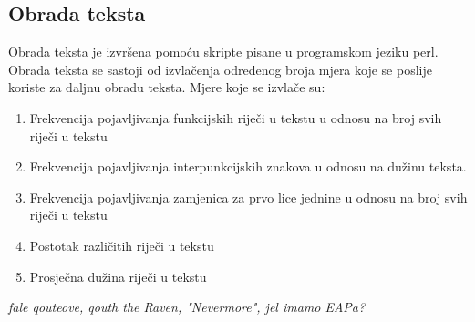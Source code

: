 \documentclass[a4paper]{article}
\begin{document}
\subsection{Obrada teksta}
Obrada teksta je izvršena pomoću skripte pisane u programskom jeziku perl. Obrada teksta se sastoji od izvlačenja određenog broja mjera koje se poslije koriste za daljnu obradu teksta.
Mjere koje se izvlače su:
\begin{enumerate}
\item Frekvencija pojavljivanja funkcijskih riječi u tekstu u odnosu na broj svih riječi u tekstu
\item Frekvencija pojavljivanja interpunkcijskih znakova u odnosu na dužinu teksta.
\item Frekvencija pojavljivanja zamjenica za prvo lice jednine u odnosu na broj svih riječi u tekstu
\item Postotak različitih riječi u tekstu
\item Prosječna dužina riječi u tekstu
\end{enumerate}
\emph{fale qouteove, qouth the Raven, "Nevermore", jel imamo EAPa?}
\end{document}
